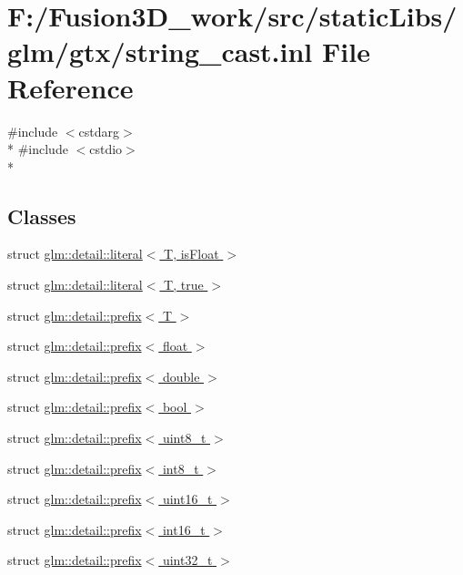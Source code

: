 \hypertarget{string__cast_8inl}{}\section{F\+:/\+Fusion3\+D\+\_\+work/src/static\+Libs/glm/gtx/string\+\_\+cast.inl File Reference}
\label{string__cast_8inl}
{\ttfamily \#include $<$cstdarg$>$}\\*
{\ttfamily \#include $<$cstdio$>$}\\*
\subsection*{Classes}
\begin{DoxyCompactItemize}
\item 
struct \hyperlink{structglm_1_1detail_1_1literal}{glm\+::detail\+::literal$<$ T, is\+Float $>$}
\item 
struct \hyperlink{structglm_1_1detail_1_1literal_3_01_t_00_01true_01_4}{glm\+::detail\+::literal$<$ T, true $>$}
\item 
struct \hyperlink{structglm_1_1detail_1_1prefix}{glm\+::detail\+::prefix$<$ T $>$}
\item 
struct \hyperlink{structglm_1_1detail_1_1prefix_3_01float_01_4}{glm\+::detail\+::prefix$<$ float $>$}
\item 
struct \hyperlink{structglm_1_1detail_1_1prefix_3_01double_01_4}{glm\+::detail\+::prefix$<$ double $>$}
\item 
struct \hyperlink{structglm_1_1detail_1_1prefix_3_01bool_01_4}{glm\+::detail\+::prefix$<$ bool $>$}
\item 
struct \hyperlink{structglm_1_1detail_1_1prefix_3_01uint8__t_01_4}{glm\+::detail\+::prefix$<$ uint8\+\_\+t $>$}
\item 
struct \hyperlink{structglm_1_1detail_1_1prefix_3_01int8__t_01_4}{glm\+::detail\+::prefix$<$ int8\+\_\+t $>$}
\item 
struct \hyperlink{structglm_1_1detail_1_1prefix_3_01uint16__t_01_4}{glm\+::detail\+::prefix$<$ uint16\+\_\+t $>$}
\item 
struct \hyperlink{structglm_1_1detail_1_1prefix_3_01int16__t_01_4}{glm\+::detail\+::prefix$<$ int16\+\_\+t $>$}
\item 
struct \hyperlink{structglm_1_1detail_1_1prefix_3_01uint32__t_01_4}{glm\+::detail\+::prefix$<$ uint32\+\_\+t $>$}
\item 

\end{DoxyCompactItemize}
